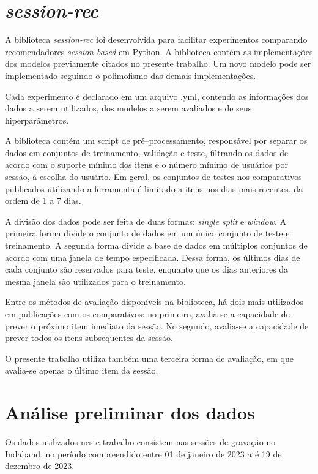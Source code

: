 \section{\textit{session-rec}} A biblioteca \textit{session-rec} foi
desenvolvida para facilitar experimentos comparando recomendadores
\textit{session-based} em Python. A biblioteca contém as implementações dos
modelos previamente citados no presente trabalho. Um novo modelo pode ser
implementado seguindo o polimofismo das demais implementações.

Cada experimento é declarado em um arquivo .yml, contendo as informações dos
dados a serem utilizados, dos modelos a serem avaliados e de seus hiperparâmetros.

A biblioteca contém um script de pré--processamento, responsável por separar os
dados em conjuntos de treinamento, validação e teste, filtrando os dados de
acordo com o suporte mínimo dos itens e o número mínimo de usuários por sessão,
à escolha do usuário. Em geral, os conjuntos de testes nos comparativos
publicados utilizando a ferramenta é limitado a itens nos dias mais recentes, da
ordem de 1 a 7 dias.

A divisão dos dados pode ser feita de duas formas: \textit{single split} e
\textit{window}. A primeira forma divide o conjunto de dados em um único
conjunto de teste e treinamento. A segunda forma divide a base de dados em
múltiplos conjuntos de acordo com uma janela de tempo especificada. Dessa forma, os
últimos dias de cada conjunto são reservados para teste, enquanto que os dias
anteriores da mesma janela são utilizados para o treinamento.

 Entre os métodos de avaliação disponíveis na biblioteca, há dois mais
 utilizados em publicações com os comparativos: no primeiro, avalia-se a
 capacidade de prever o próximo item imediato da sessão. No segundo, avalia-se a
 capacidade de prever todos os itens subsequentes da sessão.

 O presente trabalho utiliza também uma terceira forma de avaliação, em que
 avalia-se apenas o último item da sessão.

\section{Análise preliminar dos dados}

Os dados utilizados neste trabalho consistem nas sessões de gravação no
Indaband, no período compreendido entre 01 de janeiro de 2023 até 19 de dezembro
de 2023.

